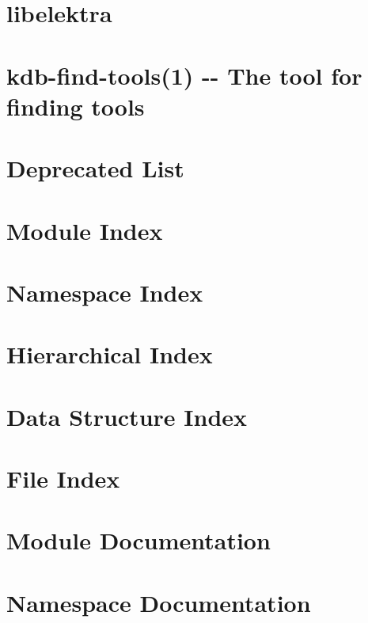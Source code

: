 \documentclass[twoside]{book}
\newcommand{\+}{\discretionary{\mbox{\scriptsize$\hookleftarrow$}}{}{}}
\begin{document}
\chapter{libelektra}
\label{README_md}
\hypertarget{README_md}{}

\chapter{kdb-\/find-\/tools(1) -\/-\/ The tool for finding tools}
\label{md_scripts_README}
\hypertarget{md_scripts_README}{}

\chapter{Deprecated List}
\label{deprecated}
\hypertarget{deprecated}{}

\chapter{Module Index}

\chapter{Namespace Index}

\chapter{Hierarchical Index}

\chapter{Data Structure Index}

\chapter{File Index}

\chapter{Module Documentation}















\chapter{Namespace Documentation}


\end{document}
